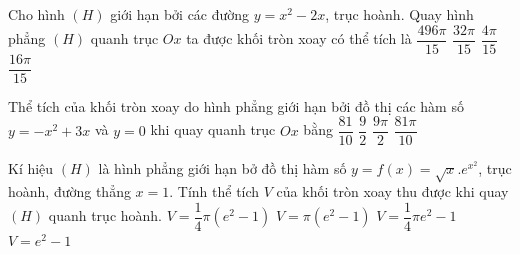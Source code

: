 \begin{ex}%
	Cho hình $(H)$ giới hạn bởi các  đường $y=x^2-2x$, trục hoành. Quay hình phẳng $(H)$ quanh trục $Ox$ ta được khối tròn xoay có thể tích là
	\choice 
		 {$\dfrac{496\pi}{15}$}
		{$\dfrac{32\pi}{15}$} 
		{$\dfrac{4\pi}{15}$} 
		 {\True $\dfrac{16\pi}{15}$}
\end{ex}

\begin{ex}%
	Thể  tích của khối tròn xoay do hình phẳng giới hạn bởi đồ thị các hàm số $y=-x^2+3x$ và $y=0$ khi quay quanh trục $Ox$ bằng
	 \choice
		{$\dfrac{81}{10}$} 
		 {$\dfrac{9}{2}$}
		 {$\dfrac{9\pi}{2}$}
		{\True  $\dfrac{81\pi}{10}$}
\end{ex}

\begin{ex}%
	Kí hiệu $(H)$ là hình phẳng giới hạn bở đồ thị hàm số $y=f(x)=\sqrt{x}.e^{x^2}$, trục hoành, đường  thẳng $x=1$. Tính thể tích $V$ của khối tròn xoay thu được khi quay $(H)$ quanh trục hoành.
	 \choice
		{\True $V=\dfrac{1}{4} \pi \left(e^2-1\right)$} 
		 {$V=\pi \left(e^2-1\right)$}
		{$V=\dfrac{1}{4}  \pi e^2-1$}
		 {$V=e^2-1$}
\end{ex}

